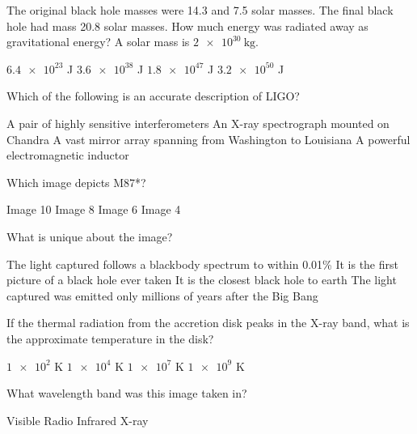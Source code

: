 \documentclass{exam}
\begin{document}
\begin{multicols*}{2}
\vfill\null\columnbreak
\begin{questions}
\setcounter{question}{10}
\question The original black hole masses were 14.3 and 7.5 solar masses. The final black hole had mass 20.8 solar masses. How much energy was radiated away as gravitational energy? A solar mass is $\SI{2e30}{\kg}$.
	\begin{choices}
	\choice $\num{6.4e23}$ J
	\choice $\num{3.6e38}$ J
	\CorrectChoice $\num{1.8e47}$ J 
	\choice $\num{3.2e50}$ J
	\end{choices}
\question Which of the following is an accurate description of LIGO?
	\begin{choices}
	\CorrectChoice A pair of highly sensitive interferometers
	\choice An X-ray spectrograph mounted on Chandra
	\choice A vast mirror array spanning from Washington to Louisiana
	\choice A powerful electromagnetic inductor
	\end{choices}
\end{questions}
\hrulefill
\begin{questions}
\setcounter{question}{12}
\question Which image depicts M87*?
	\begin{choices}
	\CorrectChoice Image 10
	\choice Image 8
	\choice Image 6
	\choice Image 4
	\end{choices}
\question What is unique about the image?
	\begin{choices}
	\choice The light captured follows a blackbody spectrum to within 0.01\%
	\CorrectChoice It is the first picture of a black hole ever taken
	\choice It is the closest black hole to earth
	\choice The light captured was emitted only millions of years after the Big Bang
	\end{choices}
\question If the thermal radiation from the accretion disk peaks in the X-ray band, what is the approximate temperature in the disk?
	\begin{choices}
	\choice $\num{1e2}$ K
	\choice $\num{1e4}$ K
	\CorrectChoice $\num{1e7}$ K 
	\choice $\num{1e9}$ K
	\end{choices}
\end{questions}
\vfill\null\columnbreak
\begin{questions}
\setcounter{question}{15}
\question What wavelength band was this image taken in?
	\begin{choices}
	\choice Visible
	\CorrectChoice Radio
	\choice Infrared
	\choice X-ray
	\end{choices}
\end{questions}
\hrulefill
\begin{questions}

\end{questions}
\end{multicols*}
\end{document}
